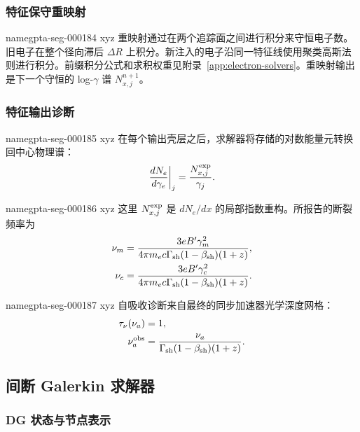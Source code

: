 \documentclass[twocolumn]{aastex702}
\makeatletter
\providecommand{\gptareaderanchor}[1]{\pdfdest name{#1} xyz}%
\providecommand{\gptareaderanchor}[1]{\special{pdf:dest (#1) [ @thispage /XYZ @xpos @ypos null ]}}%
\makeatother
\begin{document}
\subsubsection{特征保守重映射}


\gptareaderanchor{gpta-seg-000184}%
重映射通过在两个追踪面之间进行积分来守恒电子数。旧电子在整个径向滞后 \(\Delta R\) 上积分。新注入的电子沿同一特征线使用聚类高斯法则进行积分。前缀积分公式和求积权重见附录~\ref{app:electron-solvers}。重映射输出是下一个守恒的 log-\(\gamma\) 谱 \(N_{x,j}^{n+1}\)。

\subsubsection{特征输出诊断}


\gptareaderanchor{gpta-seg-000185}%
在每个输出壳层之后，求解器将存储的对数能量元转换回中心物理谱：
\begin{equation}
\frac{dN_e}{d\gamma_e}\bigg|_j
=\frac{N_{x,j}^{\rm exp}}{\gamma_j}.
\end{equation}

\gptareaderanchor{gpta-seg-000186}%
这里 \(N_{x,j}^{\rm exp}\) 是 \(dN_e/dx\) 的局部指数重构。所报告的断裂频率为
\begin{equation}
\begin{aligned}
\nu_m=\frac{3eB'\gamma_m^2}
{4\pi m_ec\Gamma_{\rm sh}(1-\beta_{\rm sh})(1+z)},\\
\nu_c=\frac{3eB'\gamma_c^2}
{4\pi m_ec\Gamma_{\rm sh}(1-\beta_{\rm sh})(1+z)}.
\end{aligned}
\end{equation}

\gptareaderanchor{gpta-seg-000187}%
自吸收诊断来自最终的同步加速器光学深度网格：
\begin{equation}
\begin{aligned}
\tau_\nu(\nu_a)&=1,\\
\nu_a^{\rm obs}&=\frac{\nu_a}
{\Gamma_{\rm sh}(1-\beta_{\rm sh})(1+z)}.
\end{aligned}
\end{equation}

\subsection{间断 Galerkin 求解器}

\subsubsection{DG 状态与节点表示}
\end{document}
